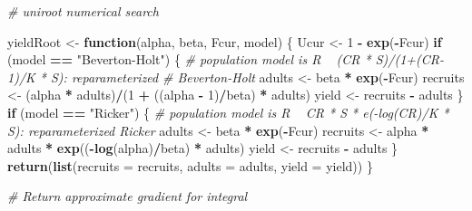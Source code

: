 \documentclass[
]{article}
\newenvironment{Shaded}{\begin{snugshade}}{\end{snugshade}}
\newcommand{\CommentTok}[1]{\textcolor[rgb]{0.56,0.35,0.01}{\textit{#1}}}
\newcommand{\ControlFlowTok}[1]{\textcolor[rgb]{0.13,0.29,0.53}{\textbf{#1}}}
\newcommand{\DataTypeTok}[1]{\textcolor[rgb]{0.13,0.29,0.53}{#1}}
\newcommand{\DecValTok}[1]{\textcolor[rgb]{0.00,0.00,0.81}{#1}}
\newcommand{\KeywordTok}[1]{\textcolor[rgb]{0.13,0.29,0.53}{\textbf{#1}}}
\newcommand{\NormalTok}[1]{#1}
\newcommand{\OperatorTok}[1]{\textcolor[rgb]{0.81,0.36,0.00}{\textbf{#1}}}
\newcommand{\StringTok}[1]{\textcolor[rgb]{0.31,0.60,0.02}{#1}}
\renewenvironment{Shaded}{\vspace{\parskip}\begin{snugshade}}{\end{snugshade}}
\begin{document}
\begin{Shaded}
\begin{Highlighting}[]
\CommentTok{# uniroot numerical search}

\NormalTok{yieldRoot <-}\StringTok{ }\ControlFlowTok{function}\NormalTok{(alpha, beta, Fcur, model) \{}
\NormalTok{    Ucur <-}\StringTok{ }\DecValTok{1} \OperatorTok{-}\StringTok{ }\KeywordTok{exp}\NormalTok{(}\OperatorTok{-}\NormalTok{Fcur)}
    \ControlFlowTok{if}\NormalTok{ (model }\OperatorTok{==}\StringTok{ "Beverton-Holt"}\NormalTok{) \{}
        \CommentTok{# population model is R ~ (CR * S)/(1+(CR-1)/K * S): reparameterized}
        \CommentTok{# Beverton-Holt}
\NormalTok{        adults <-}\StringTok{ }\NormalTok{beta }\OperatorTok{*}\StringTok{ }\KeywordTok{exp}\NormalTok{(}\OperatorTok{-}\NormalTok{Fcur)}
\NormalTok{        recruits <-}\StringTok{ }\NormalTok{(alpha }\OperatorTok{*}\StringTok{ }\NormalTok{adults)}\OperatorTok{/}\NormalTok{(}\DecValTok{1} \OperatorTok{+}\StringTok{ }\NormalTok{((alpha }\OperatorTok{-}\StringTok{ }\DecValTok{1}\NormalTok{)}\OperatorTok{/}\NormalTok{beta) }\OperatorTok{*}\StringTok{ }\NormalTok{adults)}
\NormalTok{        yield <-}\StringTok{ }\NormalTok{recruits }\OperatorTok{-}\StringTok{ }\NormalTok{adults}
\NormalTok{    \}}
    \ControlFlowTok{if}\NormalTok{ (model }\OperatorTok{==}\StringTok{ "Ricker"}\NormalTok{) \{}
        \CommentTok{# population model is R ~ CR * S * e(-log(CR)/K * S): reparameterized Ricker}
\NormalTok{        adults <-}\StringTok{ }\NormalTok{beta }\OperatorTok{*}\StringTok{ }\KeywordTok{exp}\NormalTok{(}\OperatorTok{-}\NormalTok{Fcur)}
\NormalTok{        recruits <-}\StringTok{ }\NormalTok{alpha }\OperatorTok{*}\StringTok{ }\NormalTok{adults }\OperatorTok{*}\StringTok{ }\KeywordTok{exp}\NormalTok{((}\OperatorTok{-}\KeywordTok{log}\NormalTok{(alpha)}\OperatorTok{/}\NormalTok{beta) }\OperatorTok{*}\StringTok{ }\NormalTok{adults)}
\NormalTok{        yield <-}\StringTok{ }\NormalTok{recruits }\OperatorTok{-}\StringTok{ }\NormalTok{adults}
\NormalTok{    \}}
    \KeywordTok{return}\NormalTok{(}\KeywordTok{list}\NormalTok{(}\DataTypeTok{recruits =}\NormalTok{ recruits, }\DataTypeTok{adults =}\NormalTok{ adults, }\DataTypeTok{yield =}\NormalTok{ yield))}
\NormalTok{\}}

\CommentTok{# Return approximate gradient for integral}


\end{Highlighting}
\end{Shaded}
\end{document}
